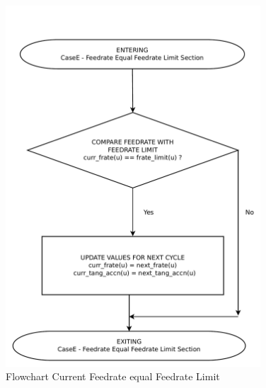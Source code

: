 \begin{figure}
	\caption{Flowchart Current Feedrate equal Feedrate Limit}
	\label{02-CaseE-Feedrate-Equal-Limit-Main-Region-flowchart.pdf}
	\centering
	\includegraphics[width=0.85\textwidth,]{Images/Chap3/02-CaseE-Feedrate-Equal-Limit-Main-Region-flowchart.pdf} 
\end{figure}


\clearpage
\pagebreak

